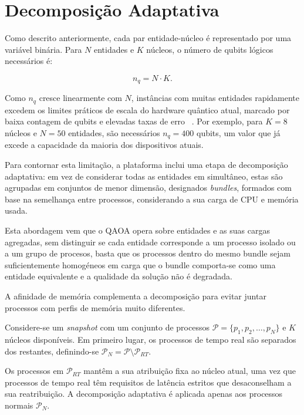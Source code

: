 \chapter{Decomposição Adaptativa}
\label{chap:decomposicao-adaptativa-clustering}

Como descrito anteriormente, cada par entidade-núcleo é representado por uma 
variável binária. Para $N$ entidades e $K$ núcleos, o número de qubits lógicos 
necessários é:

\begin{equation}
    n_q = N \cdot K.
\end{equation}

Como $n_q$ cresce linearmente com $N$, instâncias com muitas entidades rapidamente
excedem os limites práticos de escala do hardware quântico atual, marcado por baixa contagem
de qubits e elevadas taxas de erro ~\cite{Preskill2018}. Por exemplo, para $K=8$ núcleos e $N=50$ entidades,
são necessários $n_q = 400$ qubits, um valor que já excede a capacidade da maioria dos
dispositivos atuais.

Para contornar esta limitação, a plataforma 
inclui uma etapa de decomposição adaptativa: em vez de considerar todas as entidades 
em simultâneo, estas são agrupadas em conjuntos de menor dimensão, 
designados \textit{bundles}, formados com base na semelhança entre processos, considerando a sua carga de CPU e memória usada. 

Esta abordagem vem que o QAOA opera sobre entidades e as suas cargas agregadas, sem distinguir se cada entidade corresponde a um processo isolado ou a um grupo de procesos, basta que os processos dentro do mesmo bundle sejam suficientemente homogéneos em carga que o bundle comporta-se como uma entidade equivalente e a qualidade da solução não é degradada.

A afinidade de memória complementa a decomposição para evitar juntar processos com perfis de memória muito diferentes.

Considere-se um \textit{snapshot} com um conjunto de processos
$\mathcal{P} = \{p_1, p_2, \dots, p_N\}$ e $K$ núcleos disponíveis. Em primeiro lugar, os processos de tempo real são separados dos restantes, definindo-se $\mathcal{P}_{N} = \mathcal{P} \setminus \mathcal{P}_{RT}$.

Os processos em $\mathcal{P}_{RT}$ mantêm a sua atribuição fixa ao núcleo atual, 
uma vez que processos de tempo real têm requisitos de latência estritos que 
desaconselham a sua reatribuição. A decomposição adaptativa é aplicada apenas aos processos normais $\mathcal{P}_{N}$.

